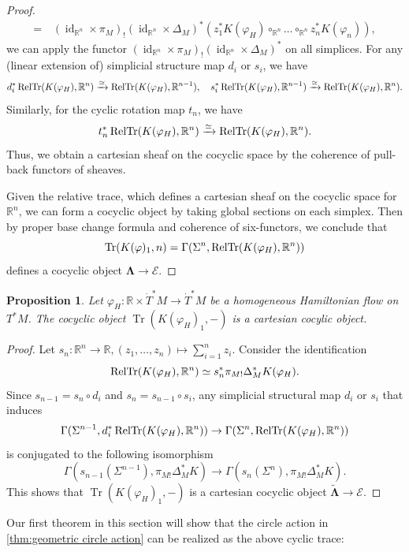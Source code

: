 \documentclass[11pt]{amsart}
\numberwithin{equation}{section}
\theoremstyle{plain}
\newtheorem{Prop}[prop]{Proposition}
\theoremstyle{definition}
\theoremstyle{remark}
\newcommand{\bR} { {\mathbb{R}}}
\newcommand{\cE} { {\mathcal{E}}}
\newcommand{\id}{{\operatorname{id}}}
\newcommand\Tr{\operatorname{Tr}}
\begin{document}
\begin{proof}
\begin{align*}
=&\, (\id_{\bR^n} \times \pi_M)_!(\id_{\bR^n} \times \Delta_M)^*(z_1^*K(\varphi_H) \circ_{\bR^n} \dots \circ_{\bR^n} z_n^*K(\varphi_n)),
\end{align*}
we can apply the functor $(\id_{\bR^n} \times \pi_M)_!(\id_{\bR^n} \times \Delta_M)^*$ on all simplices. For any (linear extension of) simplicial structure map $d_i$ or $s_i$, we have
\[d_i^*\RelTr(K(\varphi_H), \bR^{n})\xrightarrow{\simeq } \RelTr(K(\varphi_H), \bR^{n-1}), \quad s_i^*\RelTr(K(\varphi_H), \bR^{n-1})\xrightarrow{\simeq } \RelTr(K(\varphi_H), \bR^n).\]
Similarly, for the cyclic rotation map $t_n$, we have
\[t_n^*\RelTr(K(\varphi_H), \bR^n)  \xrightarrow{\simeq }  \RelTr(K(\varphi_H), \bR^n).\]
Thus, we obtain a cartesian sheaf on the cocyclic space by the coherence of pull-back functors of sheaves. 

Given the relative trace, which defines a cartesian  sheaf on the cocyclic space for $\bR^n$, we can form a cocyclic object by taking global sections on each simplex. Then by proper base change formula and coherence of six-functors, we conclude that
\[\Tr(K(\varphi)_1, n) = \Gamma(\Sigma^n, \RelTr(K(\varphi_H), \bR^n))\]
defines a cocyclic object $\boldsymbol{\Lambda} \to \cE$.
\end{proof}









\begin{Prop}Let $\varphi_H: \bR \times \dot T^*M \to \dot T^*M$ be a homogeneous Hamiltonian flow on $T^*M$. The cocyclic object $\Tr(K(\varphi_H)_1,-)$ is a cartesian cocylic object.
\end{Prop}
\begin{proof}
Let $s_n: \bR^n \to \bR, (z_1, \dots, z_n) \mapsto \sum_{i=1}^n z_i$. Consider the identification
\[\RelTr(K(\varphi_H), \bR^n)\simeq s_n^*\pi_{M!}\Delta_M^*K(\varphi_H).\]
Since $s_{n-1} = s_n \circ d_i$ and $s_n = s_{n-1} \circ s_i$, any simplicial structural map $d_i$ or $s_i$ that induces
\[\Gamma(\Sigma^{n-1}, d_i^*\RelTr(K(\varphi_H),\bR^n)) \to \Gamma(\Sigma^n, \RelTr(K(\varphi_H),\bR^n))\]
is conjugated to the following isomorphism
\[\Gamma(s_{n-1}(\Sigma^{n-1}),\pi_{M!}\Delta_M^*K)\to \Gamma(s_n(\Sigma^n),\pi_{M!}\Delta_M^*K). \]
This shows that $\Tr(K(\varphi_H)_1,-)$ is a cartesian cocyclic object $\widetilde{\boldsymbol{\Lambda}} \to \cE$.
\end{proof}

Our first theorem in this section will show that the circle action in \autoref{thm:geometric circle action} can be realized as the above cyclic trace:
\end{document}
